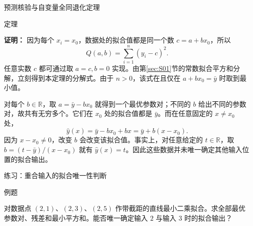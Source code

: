 \documentclass[aspectratio=169,10pt,fontset=fandol]{ctexbeamer}
\begin{document}
\begin{frame}[t,fragile]{预测核验与自变量全同退化定理}
\begin{block}{定理}
{%
}
\end{block}
\pause
{\small
\textbf{证明：}
因为每个 $x_i=x_0$，数据处的拟合值都是同一个数 $c=a+bx_0$，所以
\[
Q(a,b)=\sum_{i=1}^{n}(y_i-c)^2.
\]
任意实数 $c$ 都可通过取 $a=c,b=0$ 实现。由第\ref{sec:S01}节的常数拟合平方和分解，立刻得到本定理的分解式。由于 $n>0$，该式在且仅在 $a+bx_0=\bar{y}$ 时取到最小值。

对每个 $b\in\mathbb{R}$，取 $a=\bar{y}-bx_0$ 就得到一个最优参数对；不同的 $b$ 给出不同的参数对，故共有无穷多个。它们在 $x_0$ 处的拟合值都是 $\bar{y}$。而在任意固定的 $x\ne x_0$ 处，
\[
\hat{y}(x)=\bar{y}-bx_0+bx=\bar{y}+b(x-x_0).
\]
因为 $x-x_0\ne0$，改变 $b$ 会改变该拟合值。事实上，对任意给定的 $t\in\mathbb{R}$，取 $b=(t-\bar{y})/(x-x_0)$ 就有 $\hat{y}(x)=t$。因此这些数据并未唯一确定其他输入位置的拟合输出。

}
\end{frame}
\begin{frame}[t,fragile]{练习：重合输入的拟合唯一性判断}
\normalsize
\begin{block}{例题}
{\normalsize
对数据点 $(2,1)$、$(2,3)$、$(2,5)$ 作带截距的直线最小二乘拟合。求全部最优参数对、残差和最小平方和。能否唯一确定输入 $2$ 与输入 $3$ 时的拟合输出？

}
\end{block}
\end{frame}
\end{document}
